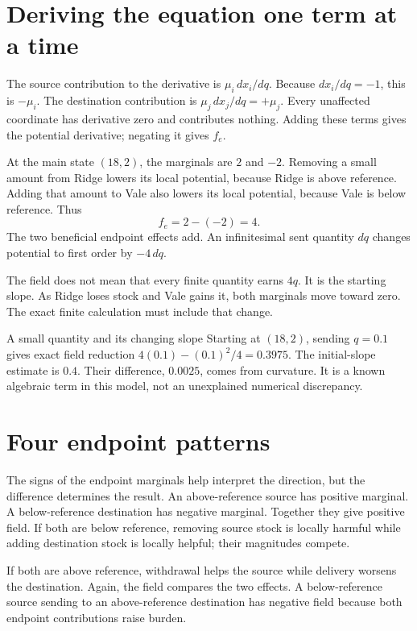\section{Deriving the equation one term at a time}
The source contribution to the derivative is \(\mu_i\,dx_i/dq\). Because \(dx_i/dq=-1\), this is \(-\mu_i\). The destination contribution is \(\mu_j\,dx_j/dq=+\mu_j\). Every unaffected coordinate has derivative zero and contributes nothing. Adding these terms gives the potential derivative; negating it gives \(f_e\).

At the main state \((18,2)\), the marginals are \(2\) and \(-2\). Removing a small amount from Ridge lowers its local potential, because Ridge is above reference. Adding that amount to Vale also lowers its local potential, because Vale is below reference. Thus
\begin{equation}
 f_e=2-(-2)=4.
\end{equation}
The two beneficial endpoint effects add. An infinitesimal sent quantity \(dq\) changes potential to first order by \(-4\,dq\).

The field does not mean that every finite quantity earns \(4q\). It is the starting slope. As Ridge loses stock and Vale gains it, both marginals move toward zero. The exact finite calculation must include that change.

\begin{workedbox}{A small quantity and its changing slope}
Starting at \((18,2)\), sending \(q=0.1\) gives exact field reduction \(4(0.1)-(0.1)^2/4=0.3975\). The initial-slope estimate is \(0.4\). Their difference, \(0.0025\), comes from curvature. It is a known algebraic term in this model, not an unexplained numerical discrepancy.
\end{workedbox}

\section{Four endpoint patterns}
The signs of the endpoint marginals help interpret the direction, but the difference determines the result. An above-reference source has positive marginal. A below-reference destination has negative marginal. Together they give positive field. If both are below reference, removing source stock is locally harmful while adding destination stock is locally helpful; their magnitudes compete.

If both are above reference, withdrawal helps the source while delivery worsens the destination. Again, the field compares the two effects. A below-reference source sending to an above-reference destination has negative field because both endpoint contributions raise burden.

